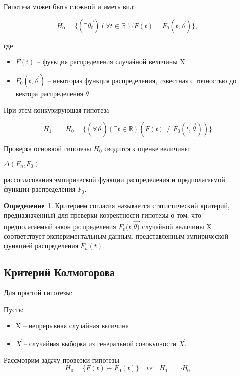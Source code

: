\documentclass[a4paper, 12pt]{article}
\theoremstyle{definition}
\newtheorem{definition}{Определение}[section]
\theoremstyle{leads}
\theoremstyle{example}
\theoremstyle{remark}
\begin{document}
Гипотеза может быть сложной и иметь вид:

\begin{equation*}
	H_0 = \{(\exists \vec{\theta_0})(\forall t \in \mathbb{R})(F(t) = F_0(t, \vec{\theta})\},
\end{equation*}

где 
\begin{itemize}
	\item $F(t)$ -- функция распределения случайной величины X
	\item $F_0(t, \vec{\theta})$ -- некоторая функция распределения, известная с точностью до вектора распределения $\theta$
\end{itemize}

При этом конкурирующая гипотеза

\begin{equation*}
	H_1 = \neg H_0 = \{(\forall \vec{\theta}) (\exists t \in \mathbb{R})(F(t) \neq F_0(t, \vec{\theta}))\}
\end{equation*}

Проверка основной гипотезы $H_0$ сводится к оценке величины 
\begin{center}
	\centering
	$\Delta (F_n, F_0)$
\end{center}  
рассогласования эмпирической функции распределения и предполагаемой функции распределения  $F_0$.

\begin{definition}
	Критерием согласия  называется статистический критерий, предназначенный для проверки корректности гипотезы о том, что предполагаемый закон распределения $F_0(t, \vec{\theta)}$ случайной величины X соответствует экспериментальным данным, представленным эмпирической функцией распределения $F_n(t)$.
\end{definition}

\subsection{Критерий Колмогорова}

Для простой гипотезы:

Пусть:
\begin{itemize}
	\item X -- непрерывная случайная величина
	\item $\vec{X}$ -- случайная выборка из генеральной совокупности $\vec{X}$.
\end{itemize}

Рассмотрим задачу проверки гипотезы 
\begin{equation*}
	H_0 = \{F(t) \equiv F_0(t)\} \quad vs \quad H_1 = \neg H_0
\end{equation*}
\end{document}

